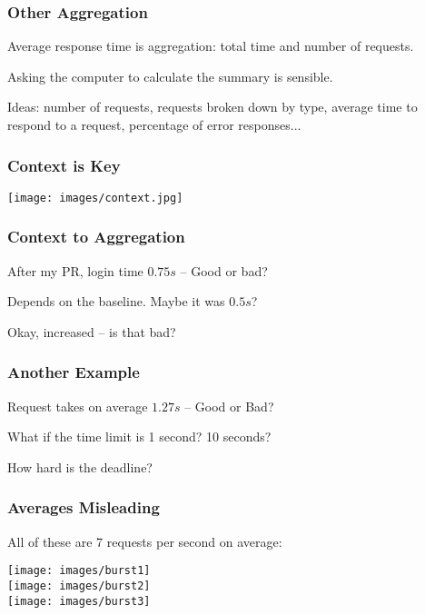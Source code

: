 \begin{frame}
\frametitle{Other Aggregation}

Average response time is aggregation: total time and number of requests.

Asking the computer to calculate the summary is sensible.

Ideas: number of requests, requests broken down by type, average time to respond to a request, percentage of error responses...  


\end{frame}


\begin{frame}
\frametitle{Context is Key}

\begin{center}
	\texttt{[image: images/context.jpg]}
\end{center}


\end{frame}


\begin{frame}
\frametitle{Context to Aggregation}

After my PR, login time $0.75s$ -- Good or bad?

Depends on the baseline. Maybe it was $0.5s$?


Okay, increased -- is that bad?

\end{frame}


\begin{frame}
\frametitle{Another Example}

Request takes on average $1.27s$ -- Good or Bad?

What if the time limit is 1 second? 10 seconds?

How hard is the deadline?

\end{frame}


\begin{frame}
\frametitle{Averages Misleading}

All of these are 7 requests per second on average:

\begin{center}
	\texttt{[image: images/burst1]}\\
	\texttt{[image: images/burst2]}\\
	\texttt{[image: images/burst3]}\\
\end{center}


\end{frame}

